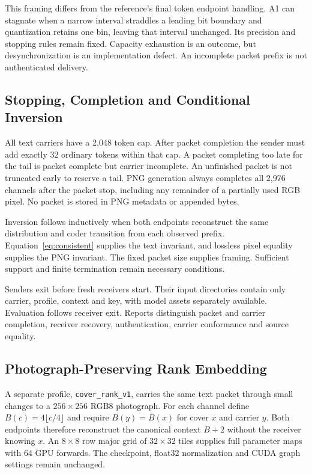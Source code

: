\documentclass[a4paper,twoside]{article}
\begin{document}
This framing differs from the reference's final token endpoint handling. A1 can stagnate when a narrow interval straddles a leading bit boundary and quantization retains one bin, leaving that interval unchanged. Its precision and stopping rules remain fixed. Capacity exhaustion is an outcome, but desynchronization is an implementation defect. An incomplete packet prefix is not authenticated delivery.

\subsection{Stopping, Completion and Conditional Inversion}
All text carriers have a 2,048 token cap. After packet completion the sender must add exactly 32 ordinary tokens within that cap. A packet completing too late for the tail is packet complete but carrier incomplete. An unfinished packet is not truncated early to reserve a tail. PNG generation always completes all 2,976 channels after the packet stop, including any remainder of a partially used RGB pixel. No packet is stored in PNG metadata or appended bytes.

Inversion follows inductively when both endpoints reconstruct the same distribution and coder transition from each observed prefix. Equation~\ref{eq:consistent} supplies the text invariant, and lossless pixel equality supplies the PNG invariant. The fixed packet size supplies framing. Sufficient support and finite termination remain necessary conditions.

Senders exit before fresh receivers start. Their input directories contain only carrier, profile, context and key, with model assets separately available. Evaluation follows receiver exit. Reports distinguish packet and carrier completion, receiver recovery, authentication, carrier conformance and source equality.

\space

\subsection{Photograph-Preserving Rank Embedding}
\label{sec:cover-method}
A separate profile, \texttt{cover\_rank\_v1}, carries the same text packet through small changes to a $256\times256$ RGB8 photograph. For each channel define $B(c)=4\lfloor c/4\rfloor$ and require $B(y)=B(x)$ for cover $x$ and carrier $y$. Both endpoints therefore reconstruct the canonical context $B+2$ without the receiver knowing $x$. An $8\times8$ row major grid of $32\times32$ tiles supplies full parameter maps with 64 GPU forwards. The checkpoint, float32 normalization and CUDA graph settings remain unchanged.
\end{document}
